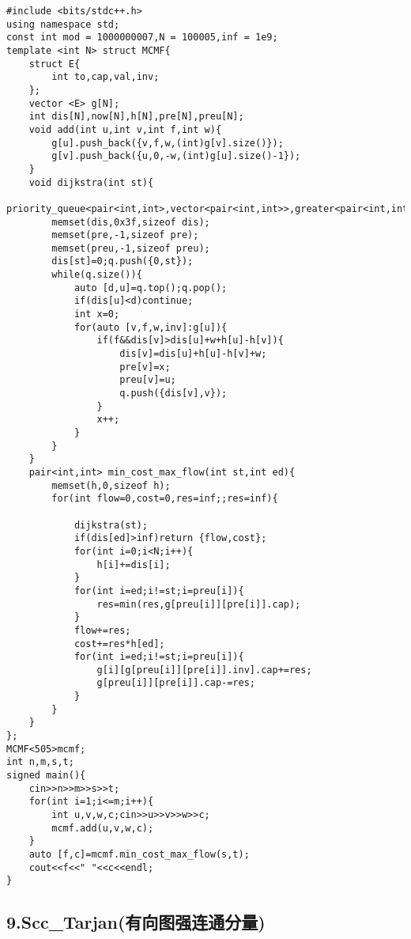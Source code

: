 \documentclass[]{article}
\begin{document}
\begin{verbatim}
#include <bits/stdc++.h>
using namespace std;
const int mod = 1000000007,N = 100005,inf = 1e9;
template <int N> struct MCMF{
    struct E{
        int to,cap,val,inv;
    };
    vector <E> g[N];
    int dis[N],now[N],h[N],pre[N],preu[N];
    void add(int u,int v,int f,int w){
        g[u].push_back({v,f,w,(int)g[v].size()});
        g[v].push_back({u,0,-w,(int)g[u].size()-1});
    }
    void dijkstra(int st){
        priority_queue<pair<int,int>,vector<pair<int,int>>,greater<pair<int,int>>>q;
        memset(dis,0x3f,sizeof dis);
        memset(pre,-1,sizeof pre);
        memset(preu,-1,sizeof preu);
        dis[st]=0;q.push({0,st});
        while(q.size()){
            auto [d,u]=q.top();q.pop();
            if(dis[u]<d)continue;
            int x=0;
            for(auto [v,f,w,inv]:g[u]){
                if(f&&dis[v]>dis[u]+w+h[u]-h[v]){
                    dis[v]=dis[u]+h[u]-h[v]+w;
                    pre[v]=x;
                    preu[v]=u;
                    q.push({dis[v],v});
                }
                x++;
            }
        }
    }
    pair<int,int> min_cost_max_flow(int st,int ed){
        memset(h,0,sizeof h);
        for(int flow=0,cost=0,res=inf;;res=inf){
            
            dijkstra(st);
            if(dis[ed]>inf)return {flow,cost};
            for(int i=0;i<N;i++){
                h[i]+=dis[i];
            }
            for(int i=ed;i!=st;i=preu[i]){
                res=min(res,g[preu[i]][pre[i]].cap);
            }
            flow+=res;
            cost+=res*h[ed];
            for(int i=ed;i!=st;i=preu[i]){
                g[i][g[preu[i]][pre[i]].inv].cap+=res;
                g[preu[i]][pre[i]].cap-=res;
            }
        }
    }
};
MCMF<505>mcmf;
int n,m,s,t;
signed main(){
    cin>>n>>m>>s>>t;
    for(int i=1;i<=m;i++){
        int u,v,w,c;cin>>u>>v>>w>>c;
        mcmf.add(u,v,w,c);
    }
    auto [f,c]=mcmf.min_cost_max_flow(s,t);
    cout<<f<<" "<<c<<endl;
}
\end{verbatim}

\hypertarget{scc_tarjanux6709ux5411ux56feux5f3aux8fdeux901aux5206ux91cf}{%
\subsection{9.Scc\_Tarjan(有向图强连通分量)}\label{scc_tarjanux6709ux5411ux56feux5f3aux8fdeux901aux5206ux91cf}}
\end{document}
